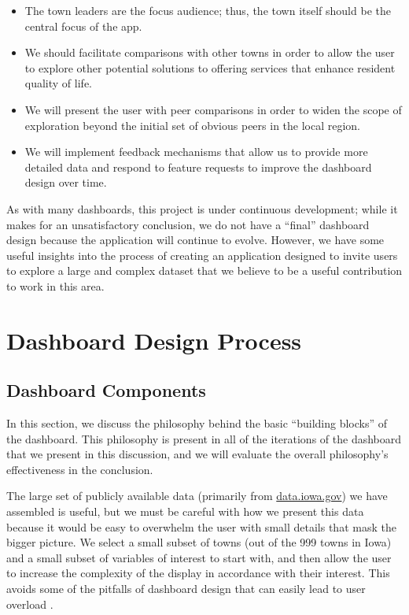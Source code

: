 \documentclass[letterpaper,inpress]{jdsart}
\begin{document}
\begin{itemize}
\item The town leaders are the focus audience; thus, the town itself should be the central focus of the app.
\item We should facilitate comparisons with other towns in order to allow the user to explore other potential solutions to offering services that enhance resident quality of life.
\item We will present the user with peer comparisons in order to widen the scope of exploration beyond the initial set of obvious peers in the local region.
\item We will implement feedback mechanisms that allow us to provide more detailed data and respond to feature requests to improve the dashboard design over time.
\end{itemize}

As with many dashboards, this project is under continuous development; while it makes for an unsatisfactory conclusion, we do not have a ``final'' dashboard design because the application will continue to evolve. However, we have some useful insights into the process of creating an application designed to invite users to explore a large and complex dataset that we believe to be a useful contribution to work in this area.

\section{ Dashboard Design Process}

\subsection{Dashboard Components }

In this section, we discuss the philosophy behind the basic ``building blocks'' of the dashboard. This philosophy is present in all of the iterations of the dashboard that we present in this discussion, and we will evaluate the overall philosophy's effectiveness in the conclusion.

The large set of publicly available data (primarily from \url{data.iowa.gov}) we have assembled is useful, but we must be careful with how we present this data because it would be easy to overwhelm the user with small details that mask the bigger picture. We select a small subset of towns (out of the 999 towns in Iowa) and a small subset of variables of interest to start with, and then allow the user to increase the complexity of the display in accordance with their interest. This avoids some of the pitfalls of dashboard design that can easily lead to user overload \citep{few}.
\end{document}
